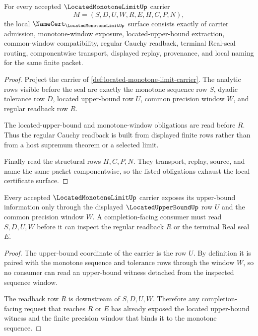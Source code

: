 \begin{theorem}
\label{thm:located-monotone-limit-namecert-obligations}
For every accepted $\LocatedMonotoneLimitUp$ carrier
$$
M=(S,D,U,W,R,E,H,C,P,N),
$$
the local $\NameCert_{\LocatedMonotoneLimitUp}$ surface consists exactly of carrier admission, monotone-window exposure, located-upper-bound extraction, common-window compatibility, regular Cauchy readback, terminal Real-seal routing, componentwise transport, displayed replay, provenance, and local naming for the same finite packet.
\end{theorem}
\begin{proof}
Project the carrier of \autoref{def:located-monotone-limit-carrier}. The analytic rows visible before the seal are exactly the monotone sequence row $S$, dyadic tolerance row $D$, located upper-bound row $U$, common precision window $W$, and regular readback row $R$.

The located-upper-bound and monotone-window obligations are read before $R$. Thus the regular Cauchy readback is built from displayed finite rows rather than from a host supremum theorem or a selected limit.

Finally read the structural rows $H,C,P,N$. They transport, replay, source, and name the same packet componentwise, so the listed obligations exhaust the local certificate surface.
\end{proof}

\begin{theorem}
\label{thm:located-monotone-limit-upper-bound-extraction}
Every accepted $\LocatedMonotoneLimitUp$ carrier exposes its upper-bound information only through the displayed $\LocatedUpperBoundUp$ row $U$ and the common precision window $W$. A completion-facing consumer must read $S,D,U,W$ before it can inspect the regular readback $R$ or the terminal Real seal $E$.
\end{theorem}
\begin{proof}
The upper-bound coordinate of the carrier is the row $U$. By definition it is paired with the monotone sequence and tolerance rows through the window $W$, so no consumer can read an upper-bound witness detached from the inspected sequence window.

The readback row $R$ is downstream of $S,D,U,W$. Therefore any completion-facing request that reaches $R$ or $E$ has already exposed the located upper-bound witness and the finite precision window that binds it to the monotone sequence.
\end{proof}

